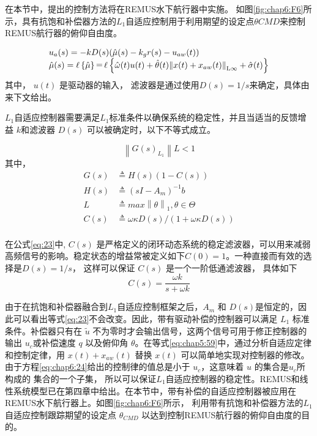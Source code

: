 在本节中，提出的控制方法将在REMUS水下航行器中实施。 如图\ref{fig:chap6:F6}所示，具有抗饱和补偿器方法的$L_{1}$自适应控制用于利用期望的设定点$\theta{CMD}$来控制REMUS航行器的俯仰自由度。

\begin{equation}
\begin{array}{l}
 {u_a}(s) =  - kD(s)(\hat \mu (s) - {k_g}r(s) - {u_{aw}}(t)) \\
 \hat \mu (s) = \ell \left\{ {\hat \mu } \right\}\mathop  = \limits^{} \ell \left\{ {\hat \omega (t)u(t) + \hat \theta (t){{\left\| {x(t) + {x_{aw}}(t)} \right\|}_{{\rm{L}}\infty }} + \hat \sigma (t)} \right\} \\
 \end{array}
 \label{eq:chap6:24}
\end{equation}
其中， $u(t)$ 是驱动器的输入， 滤波器是通过使用$D(s)= 1/s$来确定，具体由来下文给出。

$L_{1}$自适应控制器需要满足$ L_1 $标准条件以确保系统的稳定性，并且当适当的反馈增益 $k$和滤波器 $D(s)$ 可以被确定时，以下不等式成立。

\begin{equation}
\label{eq:22}
\left \| G(s)_{L_{1}} \right \| L<1
\end{equation}
其中，
\begin{equation}
\label{eq:23}
\begin{aligned}
G(s) &\triangleq H(s)(1-C(s)) \\
H(s) &\triangleq (sI-A_{m})^{-1}b\\
L &\triangleq max{\left \| \theta \right \| _{1} }, {\theta \in \Theta} \\
C(s) &\triangleq \omega \kappa D(s) /(1+\omega \kappa D(s))\\
\end{aligned}
\end{equation}

在公式\ref{eq:23}中, $C(s)$ 是严格定义的闭环动态系统的稳定滤波器，可以用来减弱高频信号的影响。稳定状态的增益常被定义如下$C(0) = 1$。一种直接而有效的选择是$D(s) =  1/s$， 这样可以保证 $C(s)$ 是一个一阶低通滤波器， 具体如下
\begin{equation}
\label{eq:24}
C(s) = {}\frac{\omega k}{s + \omega k}
\end{equation}

由于在抗饱和补偿器融合到$L_{1}$自适应控制框架之后，$A_m$ 和 $D(s)$是恒定的，因此可以看出等式\ref {eq:23}不会改变。因此，带有驱动补偿的控制器可以满足 $L_1$ 标准条件。补偿器只有在 $\tilde u$ 不为零时才会输出信号，这两个信号可用于修正控制器的输出 $u_c$或补偿速度 $q$ 以及俯仰角 $\theta $。在等式\ref {eq:chap5:59}中，通过分析自适应定律和控制定律，用 $x(t)+ x_{aw}(t)$ 替换 $ x(t)$ 可以简单地实现对控制器的修改。由于方程\ref {eq:chap6:24}给出的控制律的值总是小于 $u_c$，这意味着 $u$ 的集合是$u_c$所构成的 集合的一个子集， 所以可以保证$L_{1}$自适应控制器的稳定性。REMUS和线性系统模型已在第四章中给出。在本节中，带有补偿的自适应控制器被应用在REMUS水下航行器上。如图\ref{fig:chap6:F6}所示， 利用带有抗饱和补偿器方法的$L_{1}$自适应控制跟踪期望的设定点 $\theta_{CMD}$ 以达到控制REMUS航行器的俯仰自由度的目的。

